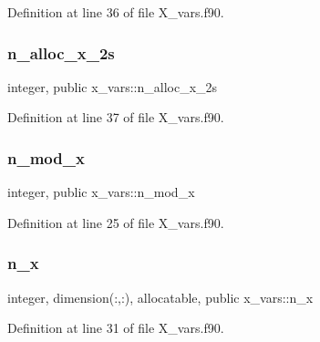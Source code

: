 Definition at line 36 of file X\+\_\+vars.\+f90.

\mbox{\label{namespacex__vars_add0d925899063fbe0c4ff05d21f35a23}} 
\subsubsection{\texorpdfstring{n\+\_\+alloc\+\_\+x\+\_\+2s}{n\_alloc\_x\_2s}}
{\footnotesize\ttfamily integer, public x\+\_\+vars\+::n\+\_\+alloc\+\_\+x\+\_\+2s}



Definition at line 37 of file X\+\_\+vars.\+f90.

\mbox{\label{namespacex__vars_a2e8fe6c5fe1cf61704bf176925d2b02e}} 
\subsubsection{\texorpdfstring{n\+\_\+mod\+\_\+x}{n\_mod\_x}}
{\footnotesize\ttfamily integer, public x\+\_\+vars\+::n\+\_\+mod\+\_\+x}



Definition at line 25 of file X\+\_\+vars.\+f90.

\mbox{\label{namespacex__vars_a61797a50c8f2d1cac7431894fe6d6ec0}} 
\subsubsection{\texorpdfstring{n\+\_\+x}{n\_x}}
{\footnotesize\ttfamily integer, dimension(\+:,\+:), allocatable, public x\+\_\+vars\+::n\+\_\+x}



Definition at line 31 of file X\+\_\+vars.\+f90.

\mbox{\label{namespacex__vars_ae7f7061534fb3ad68a538cdcea20d1d9}} 
